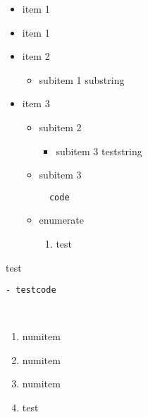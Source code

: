 \begin{itemize}
\item item 1
\item item 1
\item item 2
\begin{itemize}
\item subitem 1
  substring

\end{itemize}

\item item 3
\begin{itemize}
\item subitem 2
\begin{itemize}
\item subitem 3
teststring

\end{itemize}

\item subitem 3
\begin{verbatim}
  code
\end{verbatim}

\item enumerate
\begin{enumerate}
\item test

\end{enumerate}


\end{itemize}


\end{itemize}
test 


\begin{verbatim}
- testcode



\end{verbatim}

\begin{enumerate}
\item numitem
\item numitem
\item numitem


\item test



\end{enumerate}

